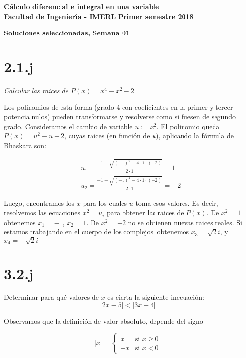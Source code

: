 \documentclass[10pt,a4paper]{article}
\begin{document}
 \hfill
          {\bf C\'{a}lculo diferencial e integral en una variable} \\
{\bf Facultad de Ingenier\'{\i}a - IMERL} \hfill {\bf Primer semestre 2018}

\vspace{0,3cm}

\begin{center}
{\bf \Large Soluciones seleccionadas, Semana 01}
\end{center}

\vspace{0,3cm}

\section*{2.1.j}

\emph{Calcular las raices de $P(x) = x^4-x^2-2$}


\noindent
Los polinomios de esta forma (grado 4 con coeficientes en la primer y tercer
potencia nulos) pueden transformarse y resolverse como si fuesen de segundo
grado.
Consideramos el cambio de variable
$u := x^2$. El polinomio queda $P(x) = u^2-u-2$,
cuyas raices (en función de $u$), aplicando la f\'ormula
de Bhaskara son:

\begin{equation*}
  \begin{split}
    &u_1 = \frac{-1 + \sqrt{(-1)^2-4\cdot 1 \cdot (-2)}}{2 \cdot 1} = 1\\
    &u_2 = \frac{-1 - \sqrt{(-1)^2-4\cdot 1 \cdot (-2)}}{2 \cdot 1} = -2
  \end{split}
\end{equation*}

\noindent
Luego, encontramos los $x$ para los cuales $u$ toma esos valores.
Es decir, resolvemos las ecuaciones $x^2 = u_i$
para obtener las raices de $P(x)$.
De $x^2=1$ obtenemos $x_1=-1$, $x_2 = 1$. De $x^2=-2$ no se obtienen nuevas
raices reales. Si estamos trabajando en el cuerpo de los complejos, obtenemos
$x_3 = \sqrt{2} i$, y $x_4 = -\sqrt{2} i$

\section*{3.2.j}
Determinar para qu\'e valores de $x$ es cierta la siguiente inecuaci\'on:
\begin{equation*}
  \vert 2x - 5 \vert  <  \vert 3x + 4 \vert
\end{equation*}

Observamos que la definici\'on de valor absoluto, depende del signo

\begin{equation*}
  \vert x \vert =
  \begin{cases}
    x & \mbox{si } x\geq 0 \\
   -x & \mbox{si } x < 0
  \end{cases}
\end{equation*}
\end{document}
